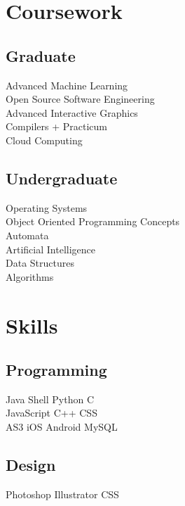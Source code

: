 \documentclass[]{deedy-resume-openfont}
\begin{document}
\begin{minipage}[t]{0.33\textwidth}

\section{Coursework}
\subsection{Graduate}
Advanced Machine Learning \\
Open Source Software Engineering \\
Advanced Interactive Graphics \\
Compilers + Practicum \\
Cloud Computing \\
\sectionsep

\subsection{Undergraduate}
Operating Systems \\
Object Oriented Programming Concepts \\
Automata \\
Artificial Intelligence \\
Data Structures \\
Algorithms
\sectionsep



\section{Skills}
\subsection{Programming}
Java \textbullet{}   Shell \textbullet{} Python \textbullet{} C \\ 
JavaScript \textbullet{} C++ \textbullet{} CSS \textbullet{} \\
AS3 \textbullet{} iOS \textbullet{} Android \textbullet{} MySQL
\sectionsep

\subsection{Design}
Photoshop \textbullet{} Illustrator \textbullet{} CSS \

%
%

\end{minipage} 
\end{document}
